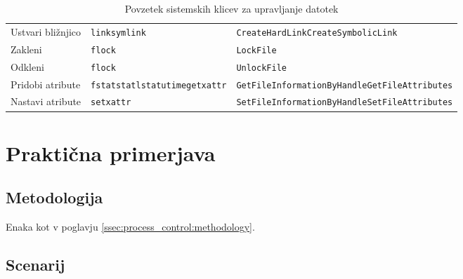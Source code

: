 \documentclass[a4paper,12pt,openright]{book}
\begin{document}
\begin{table}[h!]
\begin{center}
\begin{tabular}{ p{3.7cm}|p{2.5cm}|p{6cm} }
			Ustvari bližnjico & \verb|link|\newline\verb|symlink|                                                              & \verb|CreateHardLink|\newline\verb|CreateSymbolicLink|            \\
			Zakleni            & \verb|flock|                                                                                   & \verb|LockFile|                                                   \\
			Odkleni            & \verb|flock|                                                                                   & \verb|UnlockFile|                                                 \\
			Pridobi atribute   & \verb|fstat|\newline\verb|stat|\newline\verb|lstat|\newline\verb|utime|\newline\verb|getxattr| & \verb|GetFileInformationByHandle|\newline\verb|GetFileAttributes| \\
			Nastavi atribute   & \verb|setxattr|                                                                                & \verb|SetFileInformationByHandle|\newline\verb|SetFileAttributes| \\
		\end{tabular}
	\end{center}
	\caption{Povzetek sistemskih klicev za upravljanje datotek}
	\label{tab:file_management}
\end{table}

\section{Praktična primerjava}

\subsection{Metodologija}

Enaka kot v poglavju \ref{ssec:process_control:methodology}.

\subsection{Scenarij}
\end{document}

